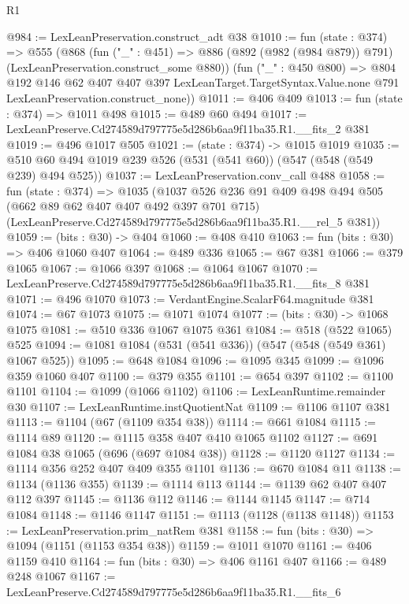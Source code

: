 \begin{lexlean}{R1}
\begin{coremodule}
@984 := LexLeanPreservation.construct_adt @38
@1010 := fun (state : @374) =>
  @555
    (@868
      (fun ("_" : @451) =>
      @886 (@892 (@982 (@984 @879)) @791) (LexLeanPreservation.construct_some @880))
      (fun ("_" : @450 @800) =>
      @804
        @192
        @146
        @62
        @407
        @407
        @397
        LexLeanTarget.TargetSyntax.Value.none
        @791
        LexLeanPreservation.construct_none))
@1011 := @406 @409
@1013 := fun (state : @374) => @1011 @498
@1015 := @489 @60 @494
@1017 := LexLeanPreserve.Cd274589d797775e5d286b6aa9f11ba35.R1.__fits_2 @381
@1019 := @496 @1017 @505
@1021 := (state : @374) -> @1015 @1019
@1035 := @510 @60 @494 @1019 @239 @526 (@531 (@541 @60)) (@547 (@548 (@549 @239) @494 @525))
@1037 := LexLeanPreservation.conv_call @488
@1058 := fun (state : @374) =>
  @1035
    (@1037
      @526
      @236
      @91
      @409
      @498
      @494
      @505
      (@662 @89 @62 @407 @407 @492 @397 @701 @715)
      (LexLeanPreserve.Cd274589d797775e5d286b6aa9f11ba35.R1.__rel_5 @381))
@1059 := (bits : @30) -> @404
@1060 := @408 @410
@1063 := fun (bits : @30) => @406 @1060 @407
@1064 := @489 @336
@1065 := @67 @381
@1066 := @379 @1065
@1067 := @1066 @397
@1068 := @1064 @1067
@1070 := LexLeanPreserve.Cd274589d797775e5d286b6aa9f11ba35.R1.__fits_8 @381
@1071 := @496 @1070
@1073 := VerdantEngine.ScalarF64.magnitude @381
@1074 := @67 @1073
@1075 := @1071 @1074
@1077 := (bits : @30) -> @1068 @1075
@1081 := @510 @336 @1067 @1075 @361
@1084 := @518 (@522 @1065) @525
@1094 := @1081 @1084 (@531 (@541 @336)) (@547 (@548 (@549 @361) @1067 @525))
@1095 := @648 @1084
@1096 := @1095 @345
@1099 := @1096 @359 @1060 @407
@1100 := @379 @355
@1101 := @654 @397
@1102 := @1100 @1101
@1104 := @1099 (@1066 @1102)
@1106 := LexLeanRuntime.remainder @30
@1107 := LexLeanRuntime.instQuotientNat
@1109 := @1106 @1107 @381
@1113 := @1104 (@67 (@1109 @354 @38))
@1114 := @661 @1084
@1115 := @1114 @89
@1120 := @1115 @358 @407 @410 @1065 @1102
@1127 := @691 @1084 @38 @1065 (@696 (@697 @1084 @38))
@1128 := @1120 @1127
@1134 := @1114 @356 @252 @407 @409 @355 @1101
@1136 := @670 @1084 @11
@1138 := @1134 (@1136 @355)
@1139 := @1114 @113
@1144 := @1139 @62 @407 @407 @112 @397
@1145 := @1136 @112
@1146 := @1144 @1145
@1147 := @714 @1084
@1148 := @1146 @1147
@1151 := @1113 (@1128 (@1138 @1148))
@1153 := LexLeanPreservation.prim_natRem @381
@1158 := fun (bits : @30) => @1094 (@1151 (@1153 @354 @38))
@1159 := @1011 @1070
@1161 := @406 @1159 @410
@1164 := fun (bits : @30) => @406 @1161 @407
@1166 := @489 @248 @1067
@1167 := LexLeanPreserve.Cd274589d797775e5d286b6aa9f11ba35.R1.__fits_6

\end{coremodule}
\end{lexlean}
